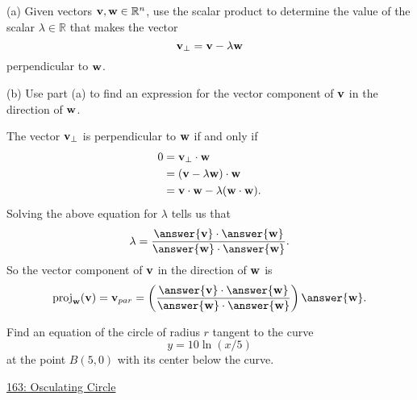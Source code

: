 \documentclass{ximera}
\begin{document}
\begin{question}   \label{Qrasd5r:Scalar}
(a) Given vectors ${\bf v}, {\bf w} \in \mathbb{R}^n$, use the scalar product to determine the value of the scalar $\lambda\in \mathbb{R}$ that makes the vector
\[
     {\bf v}_{\perp} = {\bf v} - \lambda {\bf w}
\]
perpendicular to ${\bf w}$.

(b) Use part (a) to find an expression for the vector component of ${\bf v}$ in the direction of ${\bf w}$.

\begin{explanation}
The vector ${\bf v}_{\perp}$ is perpendicular to ${\bf w}$ if and only if
\begin{align*}
     0        &=   \textbf{v}_{\perp} \cdot \textbf{w}   \\ 
               &= \left( {\bf v} - \lambda {\bf w} \right) \cdot {\bf w} \\
               &= {\bf v}\cdot {\bf w} - \lambda ({\bf w}\cdot {\bf w}) .
\end{align*}
Solving the above equation for $\lambda$ tells us that
\[
    \lambda = \frac{\answer{{\bf v}}\cdot \answer{{\bf w}}}{\answer{{\bf w}}\cdot \answer{{\bf w}}} .
\]
So the vector component of ${\bf v}$ in the direction of ${\bf w}$ is
\[
    \text{proj}_{{\bf w}}({\bf v}) = {\bf v}_{par} = \left(  \frac{\answer{{\bf v}}\cdot \answer{{\bf w}}}{\answer{{\bf w}}\cdot \answer{{\bf w}}}    \right) \answer{\bf w}.
\]
\end{explanation}
\end{question}


\begin{question} \label{Q98734454331}
Find an equation of the circle of radius $r$ tangent to the curve
\[
    y=10\ln (x/5)
\]
at the point $B(5,0)$ with its center below the curve.

 
\begin{onlineOnly}
    \begin{center}
\end{center}
\end{onlineOnly}
 
\href{https://www.geogebra.org/classic/fgvvdjaf}{163: Osculating Circle}
 
\end{question}
\end{document}
